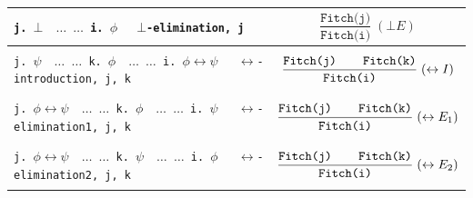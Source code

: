 \documentclass[shortabstract]{iithesis}
\theoremstyle{definition}
\theoremstyle{remark}
\theoremstyle{plain}
\begin{document}
\begin{center}
\begin{longtable}{|p{}|p{}|}
\hline

\texttt{j. $  \bot \quad  \dots$
     \newline
     $\dots$
     \newline     i. $\phi \quad$ $\bot$-elimination, j}
&
$$
\displaystyle
\frac{\texttt{Fitch(j)} }
     {\texttt{Fitch(i)}}\;(\bot E)
$$
\\
\hline






\texttt{j. $\psi \quad  \dots$
     \newline
     $\dots$
     \newline
     k. $ \phi \quad  \dots$
     \newline
     $\dots$
     \newline
     i. $\phi \leftrightarrow \psi \quad $ $\leftrightarrow$-introduction, j, k}

&

$$\displaystyle
\frac{\texttt{Fitch(j)\qquad Fitch(k)}}{\texttt{Fitch(i)}}\;(\leftrightarrow I)
$$

\\
\hline


\texttt{j. $\phi \leftrightarrow \psi \quad  \dots$
     \newline
     $\dots$
     \newline
     k. $ \phi \quad  \dots$
     \newline
     $\dots$
     \newline
     i. $\psi  \quad $ $\leftrightarrow$-elimination1, j, k}

&

$$\displaystyle
\frac{\texttt{Fitch(j)\qquad Fitch(k)}}{\texttt{Fitch(i)}}\;(\leftrightarrow E_1)
$$

\\
\hline






\texttt{j. $\phi \leftrightarrow \psi \quad  \dots$
     \newline
     $\dots$
     \newline
     k. $ \psi \quad  \dots$
     \newline
     $\dots$
     \newline
     i. $\phi  \quad $ $\leftrightarrow$-elimination2, j, k}

&

$$\displaystyle
\frac{\texttt{Fitch(j)\qquad Fitch(k)}}{\texttt{Fitch(i)}}\;(\leftrightarrow E_2)
$$

\\
\hline




\end{longtable}
\end{center}
\end{document}
